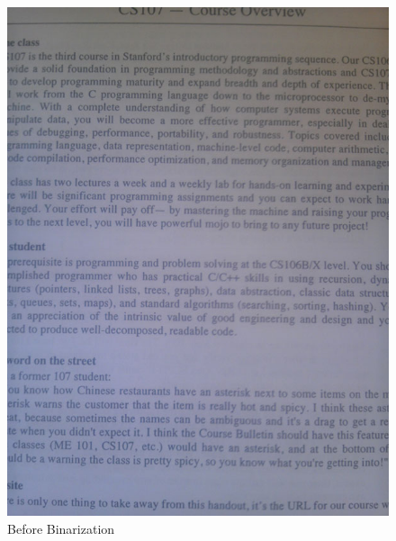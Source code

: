 \documentclass[conference]{IEEEtran}
\begin{document}
\begin{figure}
\center
\includegraphics[scale=0.25]{no_skew.jpg}
\caption{Before Binarization}
\label{noskew}
\end{figure}
\end{document}
